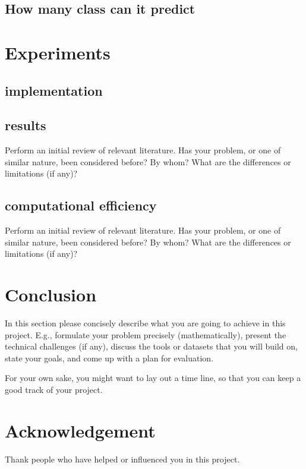 \documentclass{article}
\begin{document}
\subsection{How many class can it predict}

\section{Experiments}

\subsection{implementation}

\subsection{results}
Perform an initial review of relevant literature. Has your problem, or one of similar nature, been considered before? By whom? What are the differences or limitations (if any)?

\subsection{computational efficiency}
Perform an initial review of relevant literature. Has your problem, or one of similar nature, been considered before? By whom? What are the differences or limitations (if any)?

\section{Conclusion}
In this section please concisely describe what you are going to achieve in this project. E.g., formulate your problem precisely (mathematically), present the technical challenges (if any), discuss the tools or datasets that you will build on, state your goals, and come up with a plan for evaluation.

For your own sake, you might want to lay out a time line, so that you can keep a good track of your project.

\newpage

\section*{Acknowledgement}
Thank people who have helped or influenced you in this project.

\nocite{*}



\end{document}
